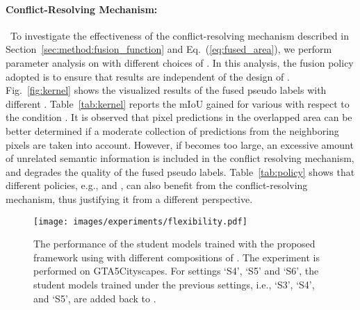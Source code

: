 \documentclass[final]{cvpr}
\begin{document}
 \paragraph{Conflict-Resolving Mechanism:}~To investigate the effectiveness of the conflict-resolving mechanism described in Section~\ref{sec:method:fusion_function} and Eq.~(\ref{eq:fused_area}), we perform parameter analysis on  with different choices of . In this analysis, the fusion policy adopted is  to ensure that results are independent of the design of . Fig.~\ref{fig:kernel} shows the visualized results of the fused pseudo labels with different . Table~\ref{tab:kernel} reports the mIoU gained for various  with respect to the condition . It is observed that pixel predictions in the overlapped area can be better determined if a moderate collection of predictions from the neighboring pixels are taken into account. However, if  becomes too large, an excessive amount of unrelated semantic information is included in the conflict resolving mechanism, and degrades the quality of the fused pseudo labels. Table~\ref{tab:policy} shows that different policies, e.g.,  and , can also benefit from the conflict-resolving mechanism, thus justifying it from a different perspective.

\begin{figure}[t]\vspace{-1.2ex}
    \texttt{[image: images/experiments/flexibility.pdf]}
    \caption{The performance of the student models trained with the proposed framework using  with different compositions of . The experiment is performed on GTA5Cityscapes. For settings `S4', `S5' and `S6', the student models trained under the previous settings, i.e., `S3', `S4', and `S5', are added back to .}
    \label{fig:flexibility}
\end{figure}
\end{document}
